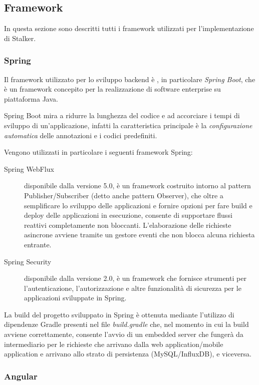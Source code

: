 \documentclass[../manuale-manutentore.tex]{subfiles}
\begin{document}
\subsection{Framework}%
\label{sub:framework}
In questa sezione sono descritti tutti i framework utilizzati per l'implementazione di Stalker.

\subsubsection{Spring}%
\label{subs:spring}

Il framework utilizzato per lo sviluppo backend è , in particolare \textit{Spring Boot}, che è un framework concepito per la realizzazione di software enterprise su piattaforma Java.

Spring Boot mira a ridurre la lunghezza del codice e ad accorciare i tempi di sviluppo di un'applicazione, infatti la caratteristica principale è la \textit{configurazione automatica} delle annotazioni e i codici predefiniti.

Vengono utilizzati in particolare i seguenti framework Spring:
\begin{description}
  \item[Spring WebFlux] disponibile dalla versione 5.0, è un framework costruito intorno al pattern Publisher/Subscriber (detto anche pattern Observer), che oltre a semplificare lo sviluppo delle applicazioni e fornire opzioni per fare build e deploy delle applicazioni in esecuzione, consente di supportare flussi reattivi completamente non bloccanti. L'elaborazione delle richieste asincrone avviene tramite un gestore eventi che non blocca alcuna richiesta entrante.
  \item[Spring Security] disponibile dalla versione 2.0, è un framework che fornisce strumenti per l'autenticazione, l'autorizzazione e altre funzionalità di sicurezza per le applicazioni sviluppate in Spring.
\end{description}

La build del progetto sviluppato in Spring è ottenuta mediante l'utilizzo di dipendenze Gradle presenti nel file \textit{build.gradle} che, nel momento in cui la build avviene correttamente, consente l'avvio di un embedded server che fungerà da intermediario per le richieste che arrivano dalla web application/mobile application e arrivano allo strato di persistenza (MySQL/InfluxDB), e viceversa.

\subsubsection{Angular}%
\label{subs:angular}
\end{document}
